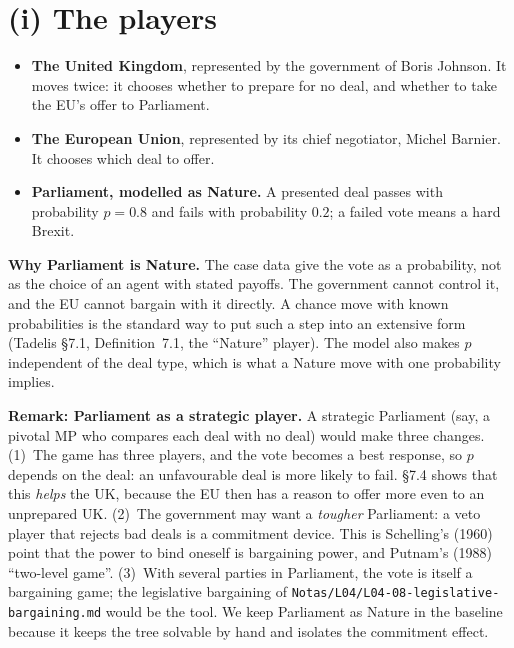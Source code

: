 \documentclass[11pt,a4paper]{article}
\begin{document}
\section{(i) The players}

\begin{itemize}
  \item \textbf{The United Kingdom}, represented by the government of Boris Johnson. It moves
    twice: it chooses whether to prepare for no deal, and whether to take the EU's offer to
    Parliament.
  \item \textbf{The European Union}, represented by its chief negotiator, Michel Barnier. It chooses
    which deal to offer.
  \item \textbf{Parliament, modelled as Nature.} A presented deal passes with probability
    $p=0.8$ and fails with probability $0.2$; a failed vote means a hard Brexit.
\end{itemize}

\textbf{Why Parliament is Nature.} The case data give the vote as a probability, not as the
choice of an agent with stated payoffs. The government cannot control it, and the EU cannot
bargain with it directly. A chance move with known probabilities is the standard way to put such
a step into an extensive form (Tadelis \S7.1, Definition~7.1, the ``Nature'' player). The model
also makes $p$ independent of the deal type, which is what a Nature move with one probability
implies.

\textbf{Remark: Parliament as a strategic player.} A strategic Parliament (say, a pivotal MP who
compares each deal with no deal) would make three changes. (1)~The game has three players, and
the vote becomes a best response, so $p$ depends on the deal: an unfavourable deal is more likely
to fail. \S7.4 shows that this \emph{helps} the UK, because the EU then has a reason to offer
more even to an unprepared UK. (2)~The government may want a \emph{tougher} Parliament: a veto
player that rejects bad deals is a commitment device. This is Schelling's (1960) point that the
power to bind oneself is bargaining power, and Putnam's (1988) ``two-level game''. (3)~With
several parties in Parliament, the vote is itself a bargaining game; the legislative bargaining of
\texttt{Notas/L04/L04-08-legislative-bargaining.md} would be the tool. We keep Parliament as
Nature in the baseline because it keeps the tree solvable by hand and isolates the commitment
effect.
\end{document}
